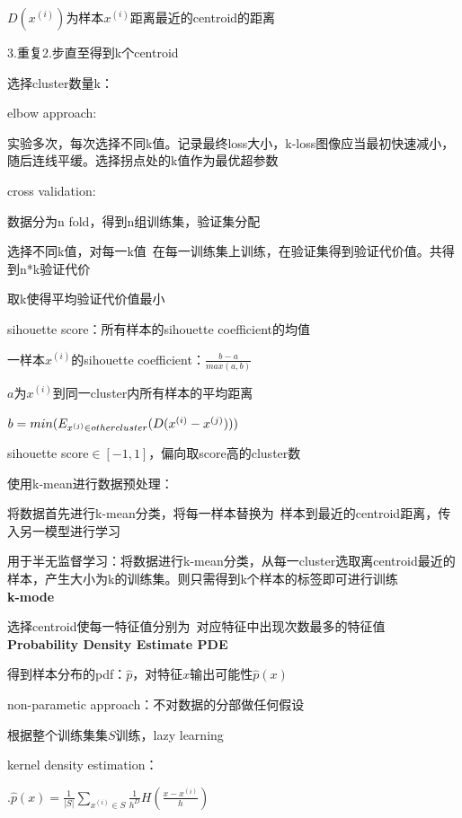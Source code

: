 \documentclass[UTF8]{ctexart}
\begin{document}
  \quad \quad \quad $D(x^{(i)})$为样本$x^{(i)}$距离最近的centroid的距离

  \quad \quad 3.重复2.步直至得到k个centroid

  \quad 选择cluster数量k：
  
  \quad \quad elbow approach:

  \quad \quad \quad 实验多次，每次选择不同k值。记录最终loss大小，k-loss图像应当最初快速减小，随后连线平缓。选择拐点处的k值作为最优超参数

  \quad \quad cross validation:

  \quad \quad \quad 数据分为n fold，得到n组训练集，验证集分配

  \quad \quad \quad 选择不同k值，对每一k值\ 在每一训练集上训练，在验证集得到验证代价值。共得到n*k验证代价

  \quad \quad \quad 取k使得平均验证代价值最小

  \quad \quad sihouette score：所有样本的sihouette coefficient的均值

  \quad \quad \quad 一样本$x^{(i)}$的sihouette coefficient：$\frac{b-a}{max(a, b)}$

  \quad \quad \quad \quad $a$为$x^{(i)}$到同一cluster内所有样本的平均距离
  
  \quad \quad \quad \quad $b = min(E_{x^{(j)} \in other \space cluster}(D(x^{(i)} - x^{(j)})))$

  \quad \quad \quad sihouette score$\in [-1, 1]$，偏向取score高的cluster数

  使用k-mean进行数据预处理：

  \quad 将数据首先进行k-mean分类，将每一样本替换为\ 样本到最近的centroid距离，传入另一模型进行学习

  \quad 用于半无监督学习：将数据进行k-mean分类，从每一cluster选取离centroid最近的样本，产生大小为k的训练集。则只需得到k个样本的标签即可进行训练\\
\textbf{k-mode}

  选择centroid使每一特征值分别为\ 对应特征中出现次数最多的特征值\\
\textbf{Probability Density Estimate PDE}

  得到样本分布的pdf：$\hat{p}$，对特征$x$输出可能性$\hat{p}(x)$

  non-parametic approach：不对数据的分部做任何假设
  
  \quad 根据整个训练集集$S$训练，lazy learning

  \quad kernel density estimation：

  \quad {}.$\hat{p}(x) = \frac{1}{|S|}\sum_{x^{(i)} \in S}\frac{1}{h^D}H(\frac{x - x^{(i)}}{h})$
\end{document}
